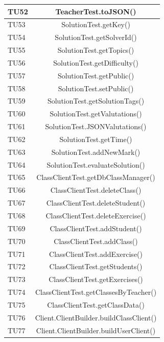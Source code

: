 \begin{longtable}{|>{\centering\arraybackslash}m{1.6cm}|c|}
		\rowcolor{LightGray}
		TU52 & TeacherTest.toJSON()\\ \hline
		TU53 & SolutionTest.getKey()\\ \hline
		\rowcolor{LightGray}
		TU54 & SolutionTest.getSolverId()\\ \hline
		TU55 & SolutionTest.getTopics()\\ \hline
		\rowcolor{LightGray}
		TU56 & SolutionTest.getDifficulty()\\ \hline
		TU57 & SolutionTest.getPublic()\\ \hline
		\rowcolor{LightGray}
		TU58 & SolutionTest.setPublic()\\ \hline
		TU59 & SolutionTest.getSolutionTags()\\ \hline
		\rowcolor{LightGray}
		TU60 & SolutionTest.getValutations()\\ \hline
		TU61 & SolutionTest.JSONValutations()\\ \hline
		\rowcolor{LightGray}
		TU62 & SolutionTest.getTime()\\ \hline
		TU63 & SolutionTest.addNewMark()\\ \hline
		\rowcolor{LightGray}
		TU64 & SolutionTest.evaluateSolution()\\ \hline
		TU65 & ClassClientTest.getDbClassManager()  \\ \hline
		\rowcolor{LightGray}
		TU66 & ClassClientTest.deleteClass()  \\ \hline
		TU67 & ClassClientTest.deleteStudent()  \\ \hline
		\rowcolor{LightGray}
		TU68 & ClassClientTest.deleteExercise()  \\ \hline
		TU69 & ClassClientTest.addStudent()  \\ \hline
		\rowcolor{LightGray}
		TU70 & ClassClientTest.addClass()  \\ \hline
		TU71 & ClassClientTest.addExercise()  \\ \hline
		\rowcolor{LightGray}
		TU72 & ClassClientTest.getStudents()  \\ \hline
		TU73 & ClassClientTest.getExercises()  \\ \hline
		\rowcolor{LightGray}
		TU74 & ClassClientTest.getClassesByTeacher()  \\ \hline
		TU75 & ClassClientTest.getClassData()  \\ \hline
		\rowcolor{LightGray}
		TU76 & Client.ClientBuilder.buildClassClient()  \\ \hline
		TU77 & Client.ClientBuilder.buildUserClient()  \\ \hline

\end{longtable}
